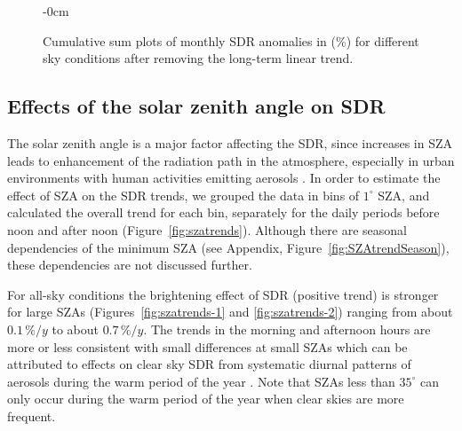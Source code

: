 \documentclass[applsci,article,submit,moreauthors,pdftex]{Definitions/mdpi}
\begin{document}
\begin{figure}[h!]
    \begin{adjustwidth}{-\extralength}{0cm}
        {\centering 
            \hfill
            \hfill
        }
        \caption{Cumulative sum plots of monthly SDR anomalies in (\%) for different sky conditions after removing the long-term linear trend.}\label{fig:cusumnotrendmonthly}
\end{adjustwidth}
\end{figure}

\hypertarget{effects-of-the-solar-zenith-angle-on-sdr}{%
\subsection{Effects of the solar zenith angle on
SDR}\label{effects-of-the-solar-zenith-angle-on-sdr}}

The solar zenith angle is a major factor affecting the SDR, since
increases in SZA leads to enhancement of the radiation path in the
atmosphere, especially in urban environments with human activities
emitting aerosols \citep{Wang2021}. In order to estimate the effect of
SZA on the SDR trends, we grouped the data in bins of \(1^\circ\) SZA,
and calculated the overall trend for each bin, separately for the daily
periods before noon and after noon (Figure~\ref{fig:szatrends}).
Although there are seasonal dependencies of the minimum SZA (see
Appendix, Figure~\ref{fig:SZAtrendSeason}), these dependencies are not
discussed further.

For all-sky conditions the brightening effect of SDR (positive trend) is
stronger for large SZAs (Figures~\ref{fig:szatrends-1} and
\ref{fig:szatrends-2}) ranging from about \(0.1\,\%/y\) to about
\(0.7\,\%/y\). The trends in the morning and afternoon hours are more or
less consistent with small differences at small SZAs which can be
attributed to effects on clear sky SDR from systematic diurnal patterns
of aerosols during the warm period of the year \citep{Wang2021}. Note
that SZAs less than \(35^\circ\) can only occur during the warm period
of the year when clear skies are more frequent.
\end{document}
